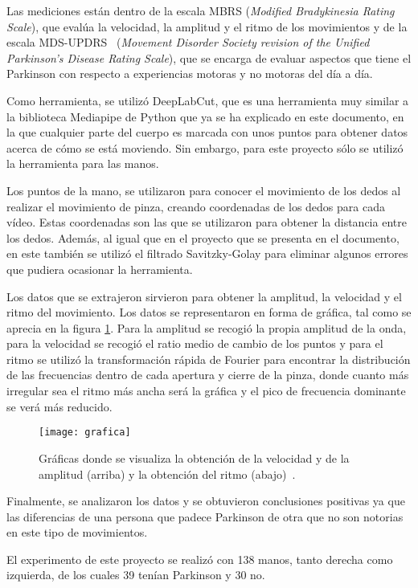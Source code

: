Las mediciones están dentro de la escala MBRS (\textit{Modified Bradykinesia Rating Scale}), que evalúa la velocidad, la amplitud y el ritmo de los movimientos y de la escala MDS-UPDRS~\cite{goetz2008mds} (\textit{Movement Disorder Society revision of the Unified Parkinson's Disease Rating Scale}), que se encarga de evaluar aspectos que tiene el Parkinson con respecto a experiencias motoras y no motoras del día a día.

Como herramienta, se utilizó DeepLabCut, que es una herramienta muy similar a la biblioteca Mediapipe de Python que ya se ha explicado en este documento, en la que cualquier parte del cuerpo es marcada con unos puntos para obtener datos acerca de cómo se está moviendo. Sin embargo, para este proyecto sólo se utilizó la herramienta para las manos.

Los puntos de la mano, se utilizaron para conocer el movimiento de los dedos al realizar el movimiento de pinza, creando coordenadas de los dedos para cada vídeo. Estas coordenadas son las que se utilizaron para obtener la distancia entre los dedos. Además, al igual que en el proyecto que se presenta en el documento, en este también se utilizó el filtrado Savitzky-Golay para eliminar algunos errores que pudiera ocasionar la herramienta.

Los datos que se extrajeron sirvieron para obtener la amplitud, la velocidad y el ritmo del movimiento. Los datos se representaron en forma de gráfica, tal como se aprecia en la figura \ref{fig:grafica}. Para la amplitud se recogió la propia amplitud de la onda, para la velocidad se recogió el ratio medio de cambio de los puntos y para el ritmo se utilizó la transformación rápida de Fourier para encontrar la distribución de las frecuencias dentro de cada apertura y cierre de la pinza, donde cuanto más irregular sea el ritmo más ancha será la gráfica y el pico de frecuencia dominante se verá más reducido.

\begin{figure}[h]
	\texttt{[image: grafica]}
	\caption{Gráficas donde se visualiza la obtención de la velocidad y de la amplitud (arriba) y la obtención del ritmo (abajo)~\cite{goetz2008mds}.}
	\label{fig:grafica}
\end{figure}

Finalmente, se analizaron los datos y se obtuvieron conclusiones positivas ya que las diferencias de una persona que padece Parkinson de otra que no son notorias en este tipo de movimientos.

El experimento de este proyecto se realizó con 138 manos, tanto derecha como izquierda, de los cuales 39 tenían Parkinson y 30 no.


